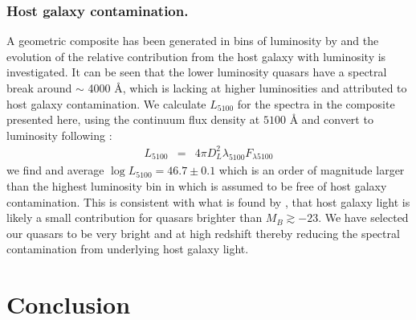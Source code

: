 \documentclass{aa}    %
\newcommand{\eqlabel}[1]{\label{eq:#1}}
\newcommand{\sectlabel}[1]{\label{sect:#1}}
\begin{document}
 
 \subsubsection{Host galaxy contamination.}  \sectlabel{Host galaxy
contamination}
A geometric composite has been generated in bins of luminosity by
\citet{Shen2011} and the evolution of the relative contribution from the host
galaxy with luminosity is investigated. It can be seen that the lower luminosity
quasars have a spectral break around $\sim$ 4000 \AA, which is lacking at higher
luminosities and attributed to host galaxy contamination. We calculate
$L_{5100}$ for the spectra in the composite presented here, using the continuum
flux density at $5100$ {\AA} and convert to luminosity following
\cite{Netzer2007}:
\begin{eqnarray}\eqlabel{l5100}
L_{5100} &=&    4 \pi D_{L} ^{2} \lambda_{5100}  F_{\lambda5100}
\end{eqnarray}
we find and average $\log L_{5100} = 46.7 \pm 0.1$ which is an order of
magnitude larger than the highest luminosity bin in \cite{Shen2011} which is
assumed to be free of host galaxy contamination. This is consistent with what is
found by \citet{Hopkins2007}, that host galaxy light is likely a small
contribution for quasars brighter than $M_{B} \gtrsim -23$. We have selected our
quasars to be very bright and at high redshift thereby reducing the spectral
contamination from underlying host galaxy light. 





\section{Conclusion}  \sectlabel{conclusion}
\end{document}
